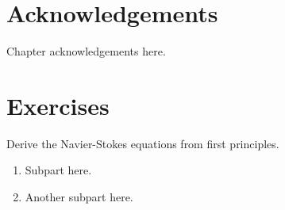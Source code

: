 \section*{Acknowledgements}
Chapter acknowledgements here.

\section*{Exercises}
\begin{exercise} 
Derive the Navier-Stokes equations from first principles.
\begin{enumerate}
\item Subpart here.
\item Another subpart here.
\end{enumerate}
\end{exercise}



